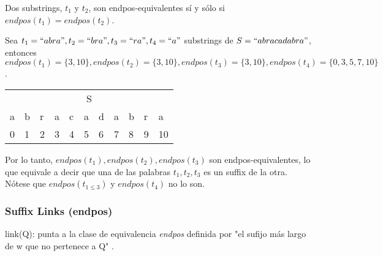 Dos \glspl{substring}, $t_1$ y $t_2$, son endpos-equivalentes sí y sólo si $endpos(t_1) = endpos(t_2)$. 

\begin{example}
	Sea $t_1=``abra", t_2=``bra", t_3=``ra", t_4=``a"$ \glspl{substring} de $S = ``abracadabra"$, entonces $endpos(t_1) = \{3, 10\}, endpos(t_2) = \{3, 10\}, endpos(t_3) = \{3, 10\}, endpos(t_4) = \{0, 3, 5, 7, 10\}$.
	\begin{center}
		\begin{tabular}{lllllllllll}
			\multicolumn{11}{c}{S}                     \\
			a & b & r & a & c & a & d & a & b & r & a  \\
			0 & 1 & 2 & 3 & 4 & 5 & 6 & 7 & 8 & 9 & 10
		\end{tabular}
	\end{center}
	
	Por lo tanto, $endpos(t_1), endpos(t_2), endpos(t_3)$ son endpos-equivalentes, lo que equivale a decir que una de las palabras $t_1, t_2, t_3 $ es un \gls{suffix} de la otra. Nótese que $endpos(t_{1\leq3})$ y $endpos(t_4)$ no lo son.
\end{example}

\subsubsection{Suffix Links (endpos)}

\begin{definition}
	link(Q): punta a la clase de equivalencia \textit{endpos} definida por "el sufijo más largo de w que no pertenece a Q" \cite{web:suffix-automata}.
\end{definition}

